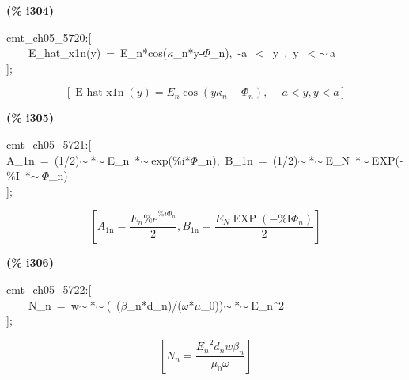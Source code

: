 \documentclass[fleqn]{article}
\begin{document}
\noindent
\begin{minipage}[t]{4.000000em}\color{red}\bfseries
(\% i304)	
\end{minipage}
\begin{minipage}[t]{\textwidth}\color{blue}
cmt\_ch05\_5720:[\\
\ \ \ \ E\_hat\_x1n(y)\ =\ E\_n*cos(\ensuremath{\kappa}\_n*y-\ensuremath{\Phi}\_n),\ -a\ \ensuremath{<}\ y\ ,\ y\ \ensuremath{<}\ensuremath{\sim\ }a\\
];
\end{minipage}
\[\displaystyle \tag{\% o304} 
\left[ \operatorname{E\_ hat\_ x1n}(y)={E_n} \cos{\left( y {{\kappa }_n}-{{\Phi }_n}\right) }\operatorname{,}-a\operatorname{<  }y\operatorname{,}y\operatorname{<  }a\right] \mbox{}
\]


\noindent
\begin{minipage}[t]{4.000000em}\color{red}\bfseries
(\% i305)	
\end{minipage}
\begin{minipage}[t]{\textwidth}\color{blue}
cmt\_ch05\_5721:[\\
A\_1n\ =\ (1/2)\ensuremath{\sim\ }*\ensuremath{\sim\ }E\_n\ *\ensuremath{\sim\ }exp(\%i*\ensuremath{\Phi}\_n),\ B\_1n\ =\ (1/2)\ensuremath{\sim\ }*\ensuremath{\sim\ }E\_N\ *\ensuremath{\sim\ }EXP(-\%I\ *\ensuremath{\sim\ }\ensuremath{\Phi}\_n)\\
];
\end{minipage}
\[\displaystyle \tag{\% o305} 
\left[ {A_{\ensuremath{\mathrm{1n}}}}=\frac{{E_n} {{\% e}^{\% i {{\Phi }_n}}}}{2}\operatorname{,}{B_{\ensuremath{\mathrm{1n}}}}=\frac{{E_N} \operatorname{EXP}\left( -\ensuremath{\mathrm{\% I}} {{\Phi }_n}\right) }{2}\right] \mbox{}
\]


\noindent
\begin{minipage}[t]{4.000000em}\color{red}\bfseries
(\% i306)	
\end{minipage}
\begin{minipage}[t]{\textwidth}\color{blue}
cmt\_ch05\_5722:[\\
\ \ \ \ N\_n\ =\ w\ensuremath{\sim\ }*\ensuremath{\sim\ }(\ (\ensuremath{\beta}\_n*d\_n)/(\ensuremath{\omega}*\ensuremath{\mu}\_0))\ensuremath{\sim\ }*\ensuremath{\sim\ }E\_n\^\ 2\\
];
\end{minipage}
\[\displaystyle \tag{\% o306} 
\left[ {N_n}=\frac{{{{E_n}}^{2}} {d_n} w {{\beta }_n}}{{{\mu }_0} \omega }\right] \mbox{}
\]
\end{document}
